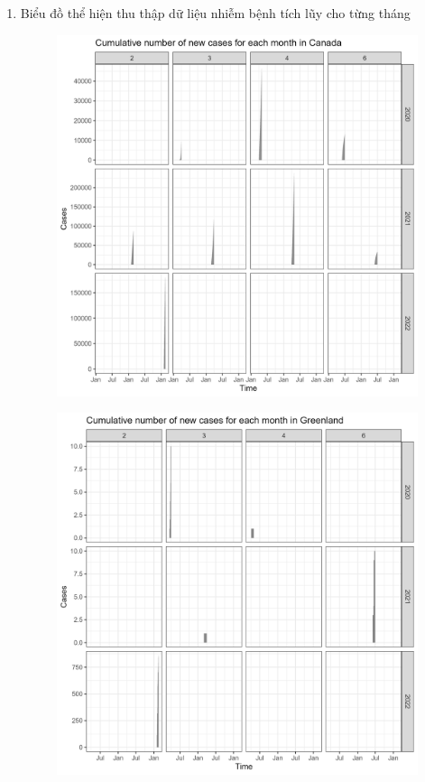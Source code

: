 \documentclass[a4paper]{article}
\theoremstyle{definition}
\begin{document}
\begin{enumerate}[i)]
\begin{enumerate}[1)]
\begin{figure}[H]
			\end{figure}
			\item Biểu đồ thể hiện thu thập dữ liệu nhiễm bệnh tích lũy cho từng tháng
			\begin{figure}[H]
				\centering
				\includegraphics[scale=0.25]{images/6.7.1.png}
			\end{figure}
			\begin{figure}[H]
				\centering
				\includegraphics[scale=0.25]{images/6.7.2.png}

\end{figure}
\end{enumerate}
\end{enumerate}
\end{document}
